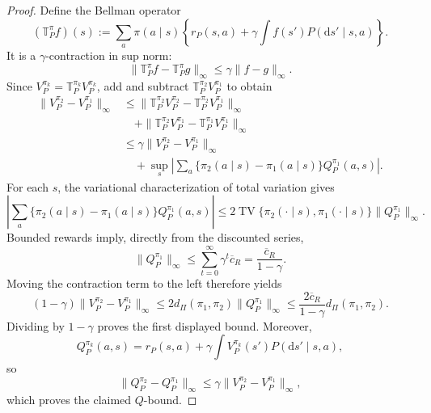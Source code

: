 \documentclass[12pt]{article}
\theoremstyle{remark}\newtheorem{remark}[theorem]{Remark}\theoremstyle{plain}
\begin{document}
\begin{proof}
    Define the Bellman operator
    \[
        (\mathbb T_P^\pi f)(s)
        :=
        \sum_a\pi(a\mid s)
        \left\{r_P(s,a)+\gamma
        \int f(s')P(\mathrm ds'\mid s,a)\right\}.
    \]
    It is a $\gamma$-contraction in sup norm:
    \[
        \|\mathbb T_P^\pi f-\mathbb T_P^\pi g\|_\infty
        \leq\gamma\|f-g\|_\infty.
    \]
    Since $V_P^{\pi_k}=\mathbb T_P^{\pi_k}V_P^{\pi_k}$,
    add and subtract
    $\mathbb T_P^{\pi_2}V_P^{\pi_1}$ to obtain
    \[
        \begin{aligned}
        \|V_P^{\pi_2}-V_P^{\pi_1}\|_\infty
        &\leq
        \|\mathbb T_P^{\pi_2}V_P^{\pi_2}
          -\mathbb T_P^{\pi_2}V_P^{\pi_1}\|_\infty\\
        &\quad+
        \|\mathbb T_P^{\pi_2}V_P^{\pi_1}
          -\mathbb T_P^{\pi_1}V_P^{\pi_1}\|_\infty\\
        &\leq
        \gamma\|V_P^{\pi_2}-V_P^{\pi_1}\|_\infty\\
        &\quad+
        \sup_s\left|
        \sum_a\{\pi_2(a\mid s)-\pi_1(a\mid s)\}
        Q_P^{\pi_1}(a,s)\right|.
        \end{aligned}
    \]
    For each $s$, the variational characterization of total
    variation gives
    \[
        \left|
        \sum_a\{\pi_2(a\mid s)-\pi_1(a\mid s)\}
        Q_P^{\pi_1}(a,s)\right|
        \leq
        2\operatorname{TV}\{\pi_2(\cdot\mid s),
        \pi_1(\cdot\mid s)\}
        \|Q_P^{\pi_1}\|_\infty.
    \]
    Bounded rewards imply, directly from the discounted series,
    \[
        \|Q_P^{\pi_1}\|_\infty
        \leq\sum_{t=0}^{\infty}\gamma^t\overline c_R
        =\frac{\overline c_R}{1-\gamma}.
    \]
    Moving the contraction term to the left therefore yields
    \[
        (1-\gamma)
        \|V_P^{\pi_2}-V_P^{\pi_1}\|_\infty
        \leq
        2d_\Pi(\pi_1,\pi_2)\|Q_P^{\pi_1}\|_\infty
        \leq
        \frac{2\overline c_R}{1-\gamma}
        d_\Pi(\pi_1,\pi_2).
    \]
    Dividing by $1-\gamma$ proves the first displayed bound.
    Moreover,
    \[
        Q_P^{\pi_k}(a,s)
        =r_P(s,a)+\gamma
        \int V_P^{\pi_k}(s')P(\mathrm ds'\mid s,a),
    \]
    so
    \[
        \|Q_P^{\pi_2}-Q_P^{\pi_1}\|_\infty
        \leq
        \gamma\|V_P^{\pi_2}-V_P^{\pi_1}\|_\infty,
    \]
    which proves the claimed $Q$-bound.


\end{proof}
\end{document}

